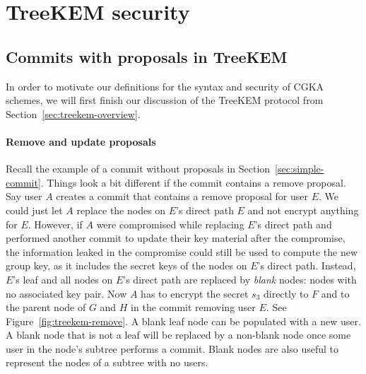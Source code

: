 \section{TreeKEM security} \label{sec:treekem-security}

\subsection{Commits with proposals in TreeKEM} \label{sec:treekem-overview-proposals}

In order to motivate our definitions for the syntax and security of CGKA schemes, we will first finish our discussion of the TreeKEM protocol from Section~\ref{sec:treekem-overview}.

\paragraph{Remove and update proposals} Recall the example of a commit without proposals in Section~\ref{sec:simple-commit}. Things look a bit different if the commit contains a remove proposal. Say user $A$ creates a commit that contains a remove proposal for user $E$. We could just let $A$ replace the nodes on $E$'s direct path $E$ and not encrypt anything for $E$. However, if $A$ were compromised while replacing $E$'s direct path and performed another commit to update their key material after the compromise, the information leaked in the compromise could still be used to compute the new group key, as it includes the secret keys of the nodes on $E$'s direct path.
Instead, $E$'s leaf and all nodes on $E$'s direct path are replaced by \emph{blank} nodes: nodes with no associated key pair. Now $A$ has to encrypt the secret $s_3$ directly to $F$ and to the parent node of $G$ and $H$ in the commit removing user $E$. See Figure~\ref{fig:treekem-remove}. A blank leaf node can be populated with a new user. A blank node that is not a leaf will be replaced by a non-blank node once some user in the node's subtree performs a commit. Blank nodes are also useful to represent the nodes of a subtree with no users.

